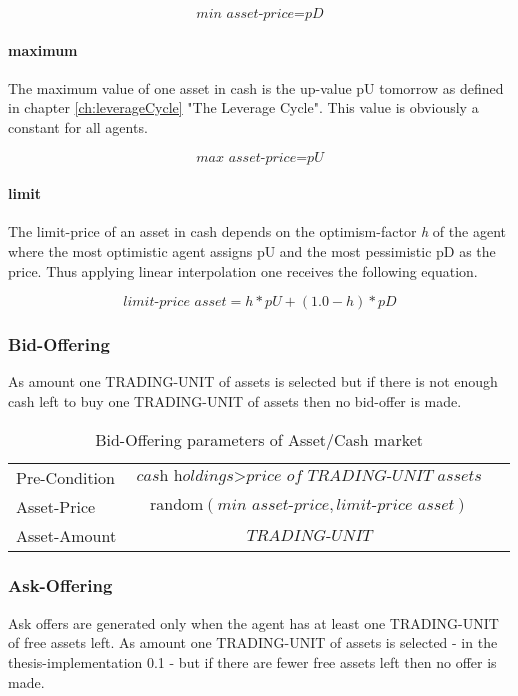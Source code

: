 \documentclass[Bachelorarbeit.tex]{subfiles}
\begin{document}
\begin{equation}
\textit{min asset-price} = \textit{pD}
\end{equation}

\paragraph{maximum}
The maximum value of one asset in cash is the up-value pU tomorrow as defined in chapter \ref{ch:leverageCycle} "The Leverage Cycle". This value is obviously a constant for all agents.

\begin{equation}
\textit{max asset-price} = \textit{pU}
\end{equation}

\paragraph{limit}
The limit-price of an asset in cash depends on the optimism-factor \textit{h} of the agent where the most optimistic agent assigns pU and the most pessimistic pD as the price. Thus applying linear interpolation one receives the following equation.

\begin{equation}
\textit{limit-price asset} = h * pU + ( 1.0 - h ) * pD
\end{equation}

\subsubsection{Bid-Offering}
As amount one TRADING-UNIT of assets is selected but if there is not enough cash left to buy one TRADING-UNIT of assets then no bid-offer is made.

\begin{table}[H]
	\centering
	\caption{Bid-Offering parameters of Asset/Cash market}
	\begin{tabular} { l c r }
		\hline
		Pre-Condition & $\textit{cash holdings} > \textit{price of TRADING-UNIT assets}$  \\
		Asset-Price & $\mathrm{random}(\textit{min asset-price}, \textit{limit-price asset})$ \\
		Asset-Amount & $\textit{TRADING-UNIT}$ \\
		\hline
	\end{tabular}
\end{table}

\subsubsection{Ask-Offering}
Ask offers are generated only when the agent has at least one TRADING-UNIT of free assets left. As amount one TRADING-UNIT of assets is selected - in the thesis-implementation 0.1 - but if there are fewer free assets left then no offer is made.
\end{document}
